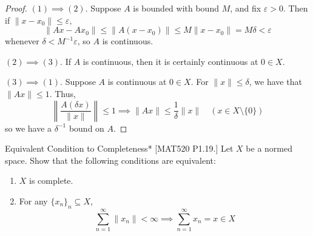 \begin{proof}
    \((1) \implies (2)\). Suppose \(A\) is bounded with bound \(M\), and fix \(\varepsilon > 0\). Then if \(\|x - x_0\| \leq \varepsilon\), 
    \[
        \|Ax - Ax_0\|
        \leq \|A(x - x_0)\|
        \leq M \|x - x_0\|
        = M \delta < \varepsilon
    \]
    whenever \(\delta < M^{-1} \varepsilon\), so \(A\) is continuous. 
    \stdvspace

    \((2) \implies (3)\). If \(A\) is continuous, then it is certainly continuous at \(0 \in X\). 
    \stdvspace

    \((3) \implies (1)\). Suppose \(A\) is continuous at \(0 \in X\). For \(\|x\| \leq \delta\), we have that \(\|Ax\| \leq 1\). Thus, 
    \[
        \left\| \frac{A(\delta x)}{\|x\|} \right\| \leq 1
        \implies 
        \|Ax\| \leq \frac{1}{\delta} \|x\|
        \quad (x \in X \setminus \{0\})
    \]
    so we have a \(\delta^{-1}\) bound on \(A\).
\end{proof}

\begin{problem}{Equivalent Condition to Completeness}*
    [MAT520 P1.19.] Let \(X\) be a normed space. Show that the following conditions are equivalent: 
    \begin{enumerate}
        \itemsep0em
        \item \(X\) is complete. 
        \item For any \(\{x_n\}_n \subseteq X\), 
        \[
            \sum_{n=1}^\infty \|x_n\| < \infty
            \implies 
            \sum_{n=1}^\infty x_n = x \in X
        \]
    \end{enumerate}
\end{problem}

